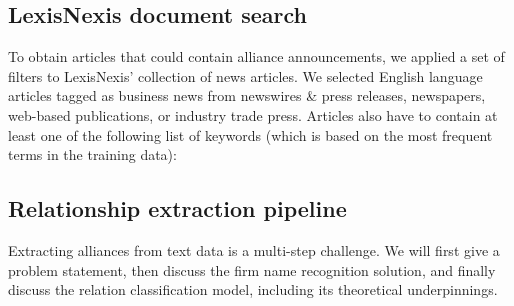 \subsection{LexisNexis document search}
\label{sec:lexis_search}
To obtain articles that could contain alliance announcements, we applied a set of filters to LexisNexis' collection of news articles. We selected English language articles tagged as business news from newswires \& press releases, newspapers, web-based publications, or industry trade press. Articles also have to contain at least one of the following list of keywords (which is based on the most frequent terms in the training data):
\begin{center}
\begin{small}
\end{small}
\end{center}

\subsection{Relationship extraction pipeline}
\label{sec:relationship_extraction_pipeline} 
Extracting alliances from text data is a multi-step challenge. We will first give a problem statement, then discuss the firm name recognition solution, and finally discuss the relation classification model, including its theoretical underpinnings.

